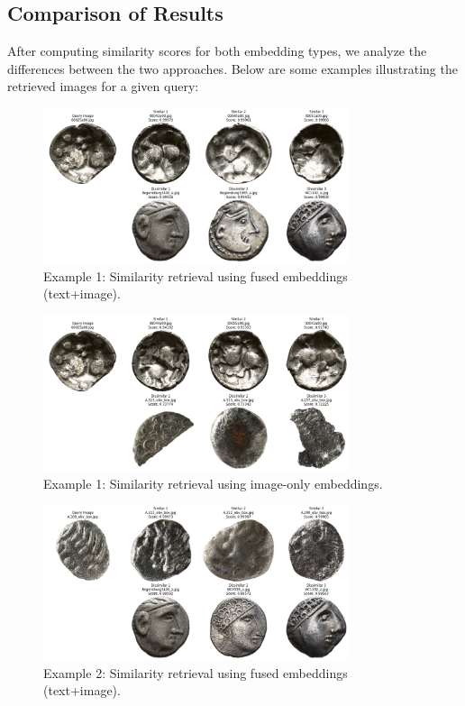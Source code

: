 \documentclass[nolibertine, english, algorithm, nomencl, minted]{ttlab-qualify}
\begin{document}
\subsection{Comparison of Results}
After computing similarity scores for both embedding types, we analyze the differences between the two approaches. 
Below are some examples illustrating the retrieved images for a given query:

\begin{figure}[H]
    \centering
    \includegraphics[width=0.8\textwidth]{static/fused_similarity_example_1.png}
    \caption{Example 1: Similarity retrieval using fused embeddings (text+image).}
    \label{fig:fused_similarity1}
\end{figure}

\begin{figure}[H]
    \centering
    \includegraphics[width=0.8\textwidth]{static/image_similarity_example_1.png}
    \caption{Example 1: Similarity retrieval using image-only embeddings.}
    \label{fig:image_similarity1}
\end{figure}

\begin{figure}[H]
    \centering
    \includegraphics[width=0.8\textwidth]{static/fused_similarity_example_2.png}
    \caption{Example 2: Similarity retrieval using fused embeddings (text+image).}
    \label{fig:fused_similarity2}
\end{figure}
\end{document}
